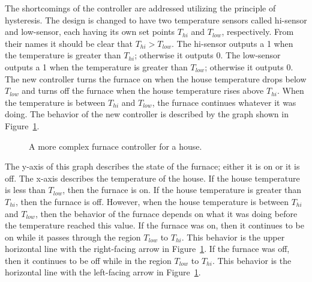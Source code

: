 The shortcomings of the controller are addressed utilizing the principle
of hysteresis.  The design is changed to have two temperature 
sensors called hi-sensor and low-sensor, each having its own set 
points $T_{hi}$ and
$T_{low}$, respectively. From their names it should be clear that 
$T_{hi} > T_{low}$.
The hi-sensor outputs a 1 when the temperature is greater than
$T_{hi}$; otherwise it outputs 0.
The low-sensor outputs a 1 when the temperature is greater than 
$T_{low}$; otherwise it outputs 0.
The new controller turns the furnace on when the house temperature 
drops below $T_{low}$ and turns off the furnace when the house temperature 
rises above $T_{hi}$.  When the temperature is between $T_{hi}$ and 
$T_{low}$, the furnace continues whatever it was doing.
The behavior of the new controller is described by the graph shown in 
Figure~\ref{fig:HysteresisGraph}.

\begin{figure}[ht]
\caption{A more complex furnace controller for a house.}
\label{fig:HysteresisGraph}
\end{figure}

The y-axis of this graph describes the state of the furnace; either it is 
on or it is off.  The x-axis describes the temperature of the house.  If the 
house temperature is less than $T_{low}$, then the furnace is on.  If the 
house temperature is greater than $T_{hi}$, then the furnace is off.  However, 
when the house temperature is between $T_{hi}$ and $T_{low}$, then the 
behavior of the furnace depends on what it was doing before the 
temperature reached this value.  If the furnace was on, then it continues
to be on while it passes through the region $T_{low}$ to $T_{hi}$. This behavior
is the upper horizontal line with the right-facing arrow in 
Figure~\ref{fig:HysteresisGraph}.  If the furnace was off, then it continues 
to be off while in the region $T_{low}$ to $T_{hi}$.  This behavior is the 
horizontal line with the left-facing arrow in Figure~\ref{fig:HysteresisGraph}.

